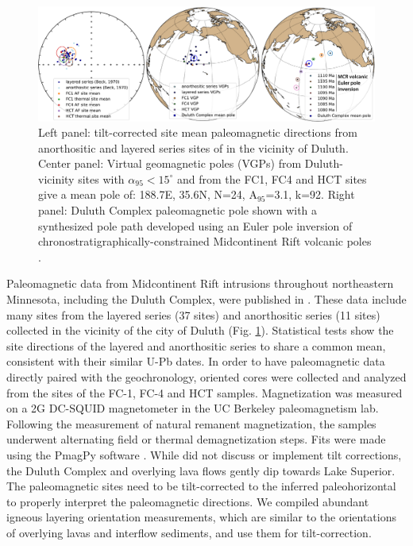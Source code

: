 \documentclass[11pt,letterpaper]{article}
\begin{document}
\begin{figure}[!ht]
\noindent\includegraphics[width=\textwidth]{./Figures/Duluth_Complex_pole.pdf}
\caption{\small{Left panel: tilt-corrected site mean paleomagnetic directions from anorthositic and layered series sites of \cite{Beck1970a} in the vicinity of Duluth. Center panel: Virtual geomagnetic poles (VGPs) from Duluth-vicinity sites with $\alpha_{95}<15^{\circ}$ and from the FC1, FC4 and HCT sites give a mean pole of: 188.7\textdegree E, 35.6\textdegree N, N=24, A$_{95}$=3.1, k=92. Right panel: Duluth Complex paleomagnetic pole shown with a synthesized pole path developed using an Euler pole inversion of chronostratigraphically-constrained Midcontinent Rift volcanic poles \citep{Swanson-Hysell2019a}.}}
\label{fig:poles}
\end{figure}

Paleomagnetic data from Midcontinent Rift intrusions throughout northeastern Minnesota, including the Duluth Complex, were published in \cite{Beck1970a}. These data include many sites from the layered series (37 sites) and anorthositic series (11 sites) collected in the vicinity of the city of Duluth (Fig. \ref{fig:poles}). Statistical tests show the site directions of the layered and anorthositic series to share a common mean, consistent with their similar U-Pb dates. In order to have paleomagnetic data directly paired with the geochronology, oriented cores were collected and analyzed from the sites of the FC-1, FC-4 and HCT samples. Magnetization was measured on a 2G DC-SQUID magnetometer in the UC Berkeley paleomagnetism lab. Following the measurement of natural remanent magnetization, the samples underwent alternating field or thermal demagnetization steps. Fits were made using the PmagPy software \citep{Tauxe2016a}. While \cite{Beck1970a} did not discuss or implement tilt corrections, the Duluth Complex and overlying lava flows gently dip towards Lake Superior. The paleomagnetic sites need to be tilt-corrected to the inferred paleohorizontal to properly interpret the paleomagnetic directions. We compiled abundant igneous layering orientation measurements, which are similar to the orientations of overlying lavas and interflow sediments, and use them for tilt-correction.
\end{document}
